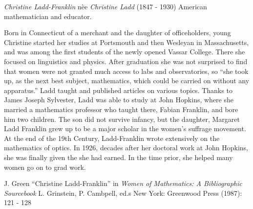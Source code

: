 \documentclass[12pt]{article}
\begin{document}
\emph{Christine Ladd-Franklin} n\`ee \emph{Christine Ladd} (1847 - 1930) American mathematician and educator.

Born in Connecticut of a merchant and the daughter of officeholders, young Christine started her studies at Portsmouth and then Wesleyan in Massachusetts, and was among the first students of the newly opened Vassar College. There she focused on linguistics and physics. After graduation she was not surprised to find that women were not granted much access to labs and observatories, so ``she took up, as the next best subject, mathematics, which could be carried on without any apparatus.'' Ladd taught and published articles on various topics. Thanks to James Joseph Sylvester, Ladd was able to study at John Hopkins, where she married a mathematics professor who taught there, Fabian Franklin, and bore him two children. The son did not survive infancy, but the daughter, Margaret Ladd Franklin grew up to be a major scholar in the women's suffrage movement. At the end of the 19th Century, Ladd-Franklin wrote extensively on the mathematics of optics. In 1926, decades after her doctoral work at John Hopkins, she was finally given the  she had earned. In the time prior, she helped many women go on to grad work.

\begin{thebibliography}{1}
 J. Green ``Christine Ladd-Franklin'' in {\it Women of Mathematics: A Bibliographic Sourcebook} L. Grinstein, P. Cambpell, ed.s New York: Greenwood Press (1987): 121 - 128
\end{thebibliography}
\end{document}
